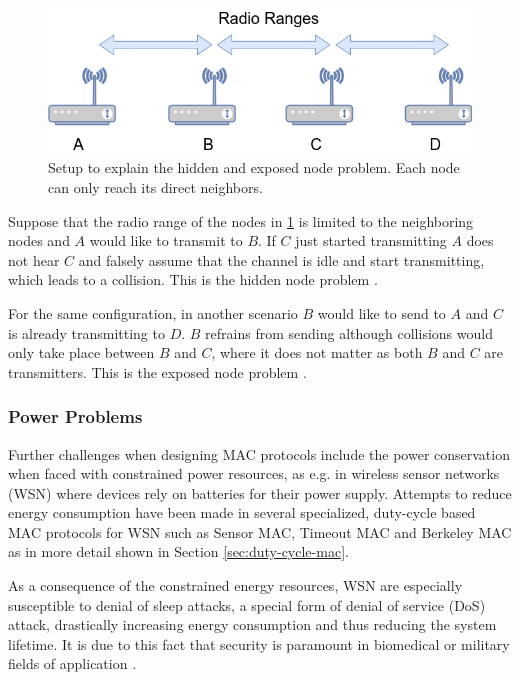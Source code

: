 \begin{figure}[tb]
	\label{fig:hidden_exposed_node_problem}
	\begin{center}
		\includegraphics[width=12cm]{pictures/hidden_exposed_node_problem}
	\end{center}
	\caption[Setup to explain the hidden and exposed node problem.]{Setup to explain the hidden and exposed node problem. Each node can only reach its direct neighbors.}
\end{figure}

Suppose that the radio range of the nodes in \ref{fig:hidden_exposed_node_problem} is limited to the neighboring nodes and $A$ would like to transmit to $B$. If $C$ just started transmitting $A$ does not hear $C$ and falsely assume that the channel is idle and start transmitting, which leads to a collision. This is the hidden node problem \cite{Tanenbaum02}\cite{Gast05}.

For the same configuration, in another scenario $B$ would like to send to $A$ and $C$ is already transmitting to $D$. $B$ refrains from sending although collisions would only take place between $B$ and $C$, where it does not matter as both $B$ and $C$ are transmitters. This is the exposed node problem \cite{Tanenbaum02}\cite{Gast05} . 

\subsubsection{Power Problems}

Further challenges when designing MAC protocols include the power conservation when faced with constrained power resources, as e.g. in wireless sensor networks (WSN) where devices rely on batteries for their power supply. Attempts to reduce energy consumption have been made in several specialized, duty-cycle based MAC protocols for WSN such as Sensor MAC, Timeout MAC and Berkeley MAC as in more detail shown in Section \ref{sec:duty-cycle-mac}.

As a consequence of the constrained energy resources, WSN are especially susceptible to denial of sleep attacks, a special form of denial of service (DoS) attack, drastically increasing energy consumption and thus reducing the system lifetime. It is due to this fact that security is paramount in biomedical or military fields of application \cite{raymond09}. 


